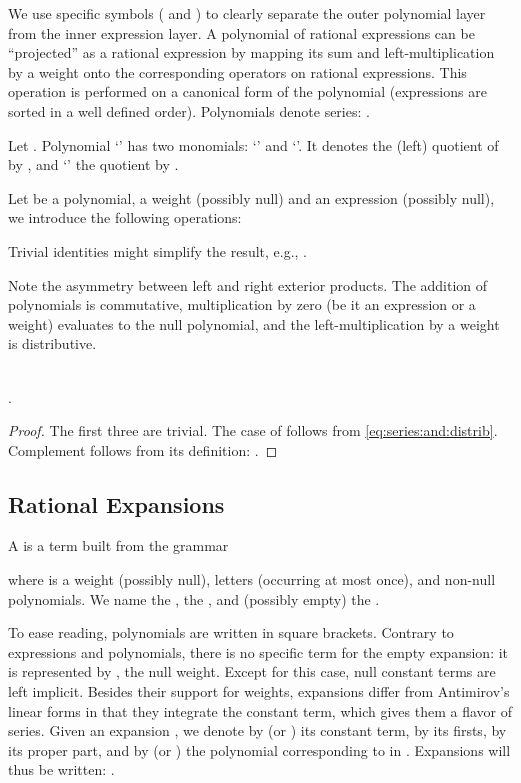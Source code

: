 \documentclass[a4paper,USenglish]{lipics}
\begin{document}
We use specific symbols ( and ) to clearly separate the outer
polynomial layer from the inner expression layer.
A polynomial  of rational expressions can be ``projected'' as a
rational expression  by mapping its sum and left-multiplication
by a weight onto the corresponding operators on rational expressions.  This
operation is performed on a canonical form of the polynomial (expressions
are sorted in a well defined order).  Polynomials denote series:
.

\begin{Example}\label{ex:e1}
  Let .  Polynomial
  `' has two monomials:
  `' and `'.  It denotes the (left) quotient of
   by , and
  `' the quotient by
  .
\end{Example}

Let 
be a polynomial,  a weight (possibly null) and  an expression
(possibly null), we introduce the following operations:

Trivial identities might simplify the result, e.g.,
.

Note the asymmetry between left and right exterior products.  The addition
of polynomials is commutative, multiplication by zero (be it an expression
or a weight) evaluates to the null polynomial, and the left-multiplication
by a weight is distributive.





\begin{Lemma}
  \label{lem:poly:ops}
  \\
  .
\end{Lemma}
\begin{proof}
  The first three are trivial.  The case of  follows from
  \cref{eq:series:and:distrib}. Complement follows from its definition:
  .
\end{proof}

\subsection{Rational Expansions}
\label{sec:expa}



\begin{Definition}
  A   is a term built from the grammar
  
  where  is a weight (possibly null),  letters
  (occurring at most once), and  non-null polynomials.  We name 
  the ,
   the , and  (possibly empty) the .
\end{Definition}
To ease reading, polynomials are written in square brackets.  Contrary to
expressions and polynomials, there is no specific term for the empty
expansion: it is represented by , the null weight.  Except for
this case, null constant terms are left implicit.  Besides their support for
weights, expansions differ from Antimirov's linear forms in that they
integrate the constant term, which gives them a flavor of series.  Given an
expansion , we denote by  (or ) its constant
term, by  its firsts, by  its proper part, and by  (or
) the polynomial corresponding to  in .  Expansions will
thus be written:
.
\end{document}
